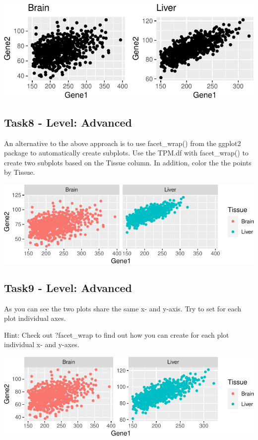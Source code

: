 \documentclass[
  7pt,
]{article}
\begin{document}
\begin{center}\includegraphics{dplyr_tidyr_ggplot2_files/figure-latex/task7-1} \end{center}

\hypertarget{task8---level-advanced}{%
\subsection{Task8 - Level: Advanced}\label{task8---level-advanced}}

An alternative to the above approach is to use facet\_wrap() from the
ggplot2 package to automatically create subplots. Use the TPM.df with
facet\_wrap() to create two subplots based on the Tissue column. In
addition, color the the points by Tissue.

\begin{center}\includegraphics{dplyr_tidyr_ggplot2_files/figure-latex/task8-1} \end{center}

\hypertarget{task9---level-advanced}{%
\subsection{Task9 - Level: Advanced}\label{task9---level-advanced}}

As you can see the two plots share the same x- and y-axis. Try to set
for each plot individual axes.

Hint: Check out ?facet\_wrap to find out how you can create for each
plot individual x- and y-axes.

\begin{center}\includegraphics{dplyr_tidyr_ggplot2_files/figure-latex/task9-1} \end{center}
\end{document}
